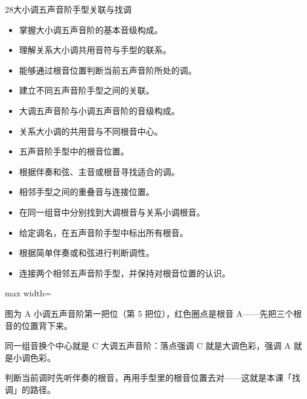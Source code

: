 \begin{lessoncard}{28}{大小调五声音阶手型关联与找调}
\begin{itemize}
\item 掌握大小调五声音阶的基本音级构成。
\item 理解关系大小调共用音符与手型的联系。
\item 能够通过根音位置判断当前五声音阶所处的调。
\item 建立不同五声音阶手型之间的关联。
\end{itemize}
\begin{itemize}
\item 大调五声音阶与小调五声音阶的音级构成。
\item 关系大小调的共用音与不同根音中心。
\item 五声音阶手型中的根音位置。
\item 根据伴奏和弦、主音或根音寻找适合的调。
\item 相邻手型之间的重叠音与连接位置。
\end{itemize}
\begin{itemize}
\item 在同一组音中分别找到大调根音与关系小调根音。
\item 给定调名，在五声音阶手型中标出所有根音。
\item 根据简单伴奏或和弦进行判断调性。
\item 连接两个相邻五声音阶手型，并保持对根音位置的认识。
\end{itemize}
\begin{fignote}
\begin{center}
\begin{adjustbox}{max width=\textwidth}
\begin{fretboard}[10]
\end{fretboard}
\end{adjustbox}
\end{center}
\begin{fignotes}
\item 图为 A 小调五声音阶第一把位（第 5 把位），红色圈点是根音 A——先把三个根音的位置背下来。
\item 同一组音换个中心就是 C 大调五声音阶：落点强调 C 就是大调色彩，强调 A 就是小调色彩。
\item 判断当前调时先听伴奏的根音，再用手型里的根音位置去对——这就是本课「找调」的路径。
\end{fignotes}
\end{fignote}
\end{lessoncard}

